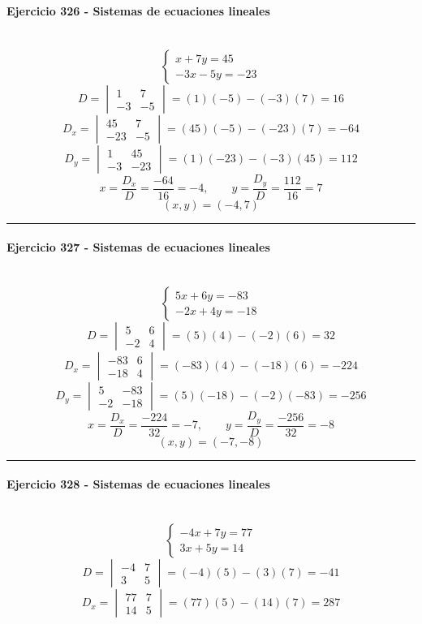 \documentclass[10pt,a4paper]{article}
\newcommand{\res}[1]{\paragraph{#1}\mbox{}\\[-1.2em]}
\begin{document}
\res{Ejercicio 326 - Sistemas de ecuaciones lineales}
\[ \begin{cases}x + 7 y=45\\- 3 x - 5 y=-23\end{cases} \]
\[ D=\begin{vmatrix}1&7\\-3&-5\end{vmatrix}=(1)(-5)-(-3)(7)=16 \]
\[ D_x=\begin{vmatrix}45&7\\-23&-5\end{vmatrix}=(45)(-5)-(-23)(7)=-64 \]
\[ D_y=\begin{vmatrix}1&45\\-3&-23\end{vmatrix}=(1)(-23)-(-3)(45)=112 \]
\[ x=\frac{D_x}{D}=\frac{-64}{16}=-4,\qquad y=\frac{D_y}{D}=\frac{112}{16}=7 \]
\[ \boxed{(x,y)=(-4,7)} \]
\vspace{1mm}\hrule\vspace{2mm}
\res{Ejercicio 327 - Sistemas de ecuaciones lineales}
\[ \begin{cases}5 x + 6 y=-83\\- 2 x + 4 y=-18\end{cases} \]
\[ D=\begin{vmatrix}5&6\\-2&4\end{vmatrix}=(5)(4)-(-2)(6)=32 \]
\[ D_x=\begin{vmatrix}-83&6\\-18&4\end{vmatrix}=(-83)(4)-(-18)(6)=-224 \]
\[ D_y=\begin{vmatrix}5&-83\\-2&-18\end{vmatrix}=(5)(-18)-(-2)(-83)=-256 \]
\[ x=\frac{D_x}{D}=\frac{-224}{32}=-7,\qquad y=\frac{D_y}{D}=\frac{-256}{32}=-8 \]
\[ \boxed{(x,y)=(-7,-8)} \]
\vspace{1mm}\hrule\vspace{2mm}
\res{Ejercicio 328 - Sistemas de ecuaciones lineales}
\[ \begin{cases}- 4 x + 7 y=77\\3 x + 5 y=14\end{cases} \]
\[ D=\begin{vmatrix}-4&7\\3&5\end{vmatrix}=(-4)(5)-(3)(7)=-41 \]
\[ D_x=\begin{vmatrix}77&7\\14&5\end{vmatrix}=(77)(5)-(14)(7)=287 \]
\end{document}
